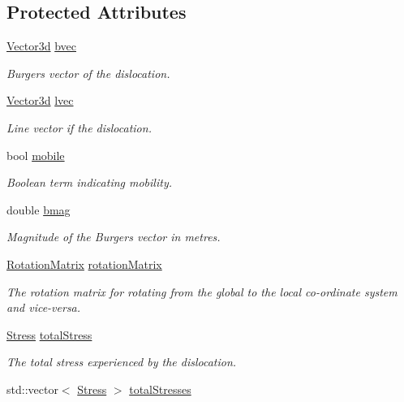 \subsection*{Protected Attributes}
\begin{DoxyCompactItemize}
\item 
\hyperlink{classVector3d}{Vector3d} \hyperlink{classDislocation_aad45c2eaade195f374707afb648ed17e}{bvec}
\begin{DoxyCompactList}\small\item\em Burgers vector of the dislocation. \end{DoxyCompactList}\item 
\hyperlink{classVector3d}{Vector3d} \hyperlink{classDislocation_a69d16092777d9ead2d4eedf7c3d47877}{lvec}
\begin{DoxyCompactList}\small\item\em Line vector if the dislocation. \end{DoxyCompactList}\item 
bool \hyperlink{classDislocation_a62c80daa260a3301baf1dceaab5d23d0}{mobile}
\begin{DoxyCompactList}\small\item\em Boolean term indicating mobility. \end{DoxyCompactList}\item 
double \hyperlink{classDislocation_a2b0284639af7fdfdf44fa0ef7fc1632e}{bmag}
\begin{DoxyCompactList}\small\item\em Magnitude of the Burgers vector in metres. \end{DoxyCompactList}\item 
\hyperlink{classRotationMatrix}{Rotation\-Matrix} \hyperlink{classDislocation_a5699d2984949af836396c8b7e5f21a5e}{rotation\-Matrix}
\begin{DoxyCompactList}\small\item\em The rotation matrix for rotating from the global to the local co-\/ordinate system and vice-\/versa. \end{DoxyCompactList}\item 
\hyperlink{classStress}{Stress} \hyperlink{classDislocation_ae27176c0d47fec3e188d7caa4c52f366}{total\-Stress}
\begin{DoxyCompactList}\small\item\em The total stress experienced by the dislocation. \end{DoxyCompactList}\item 
std\-::vector$<$ \hyperlink{classStress}{Stress} $>$ \hyperlink{classDislocation_adb36ed6c1772f2614ffbed4dcc748c13}{total\-Stresses}

\end{DoxyCompactItemize}
